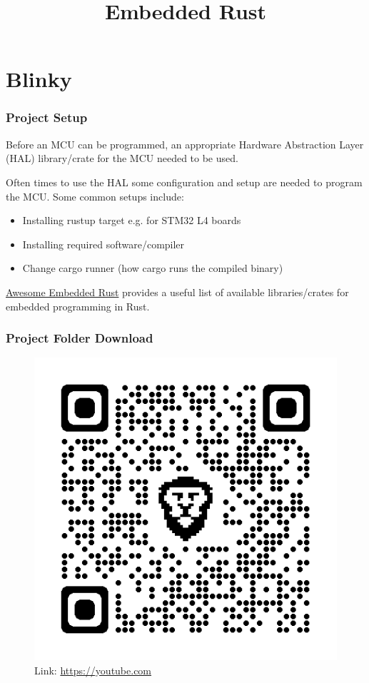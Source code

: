 \documentclass{beamer}
\title{Embedded Rust}
\begin{document}
\begin{frame}
  \titlepage{}
\end{frame}

\section{Blinky}
\begin{frame}
  \frametitle{Project Setup}
  Before an MCU can be programmed, an appropriate Hardware Abstraction Layer (HAL) library/crate for the MCU needed to be used.

  Often times to use the HAL some configuration and setup are needed to program the MCU. Some common setups include:

  \begin{itemize}
    \item{Installing rustup target e.g.  for STM32 L4 boards}
    \item{Installing required software/compiler}
    \item{Change cargo runner (how cargo runs the compiled binary)}
  \end{itemize}

  \href{https://github.com/rust-embedded/awesome-embedded-rust}{Awesome Embedded Rust} provides a useful list of available libraries/crates for embedded programming in Rust.
\end{frame}

\begin{frame}
  \frametitle{Project Folder Download}
  \begin{figure}
    \includegraphics[width=.47\textwidth]{qrcode.png}
    \caption{Link: \url{https://youtube.com}}
  \end{figure}
\end{frame}
\end{document}
